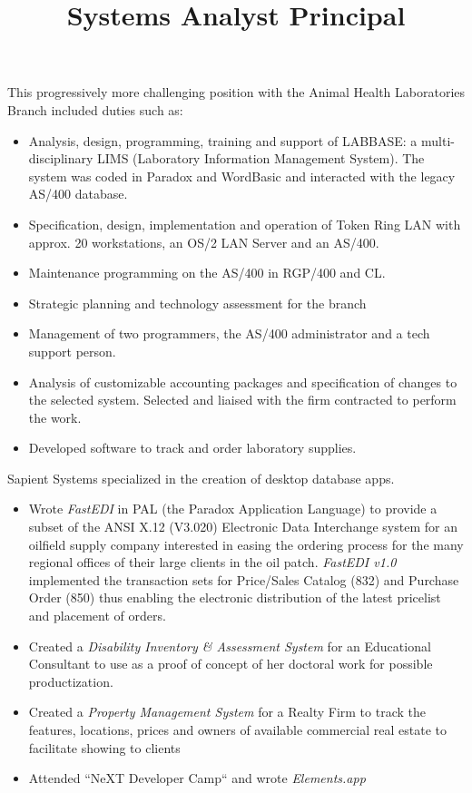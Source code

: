 \begin{resume}
\title{Systems Analyst}
\begin{position}
This progressively more challenging position with the Animal Health
Laboratories Branch included duties such as:
\begin{itemize}
\item Analysis, design, programming, training and support of LABBASE: 
        a multi-disciplinary LIMS (Laboratory Information Management System).  
	The system was coded in Paradox and WordBasic and
	interacted with the legacy AS/400 database.
\item Specification, design, implementation and operation of Token Ring LAN 
	with approx. 20 workstations, an OS/2 LAN Server and an AS/400.  
\item Maintenance programming on the AS/400 in RGP/400 and CL.  
\item Strategic planning and technology assessment for the branch 
\item Management of two programmers, the AS/400 administrator and a
	 tech support person.
\item Analysis of customizable accounting packages and specification 
	of changes to the selected system. Selected and liaised with 
	the firm contracted to perform the work.
\item Developed software to track and order laboratory supplies.
\end{itemize}
\end{position}


\title{ Principal }
\begin{position}
Sapient Systems specialized in the creation of desktop database apps.
\begin{itemize}
\item Wrote {\it FastEDI} in PAL (the Paradox Application Language)  to 
	provide a subset of the 
	ANSI X.12 (V3.020) Electronic Data Interchange system for an 
	oilfield supply company interested in easing the ordering process for
	the many regional offices of their large clients in the oil patch.  
	{\it FastEDI v1.0} implemented 
	the transaction sets for Price/Sales Catalog (832) and
	Purchase Order (850) thus enabling the electronic distribution 
	of the latest pricelist and placement of orders.
\item Created a {\it Disability Inventory \& Assessment System }
	for an Educational Consultant to use as a proof of concept of
	her doctoral work for possible productization.
\item Created a {\it Property Management System} for a Realty Firm to
	track the features, locations, prices and owners of 
	available commercial real estate to facilitate showing to clients
\item Attended ``NeXT Developer Camp`` and wrote \emph{Elements.app}
\end{itemize}
\end{position}



\end{resume}
